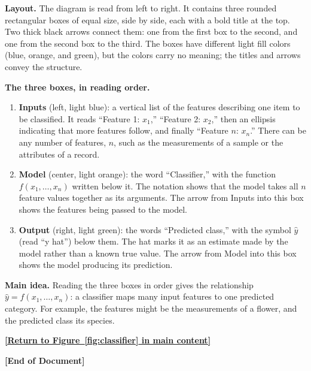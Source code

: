 \documentclass[11pt]{article}
\begin{document}
\textbf{Layout.} The diagram is read from left to right. It contains three rounded rectangular boxes of equal size, side by side, each with a bold title at the top. Two thick black arrows connect them: one from the first box to the second, and one from the second box to the third. The boxes have different light fill colors (blue, orange, and green), but the colors carry no meaning; the titles and arrows convey the structure.

\textbf{The three boxes, in reading order.}
\begin{enumerate}
    \item \textbf{Inputs} (left, light blue): a vertical list of the features describing one item to be classified. It reads ``Feature 1: $x_1$,'' ``Feature 2: $x_2$,'' then an ellipsis indicating that more features follow, and finally ``Feature $n$: $x_n$.'' There can be any number of features, $n$, such as the measurements of a sample or the attributes of a record.
    \item \textbf{Model} (center, light orange): the word ``Classifier,'' with the function $f(x_1, \ldots, x_n)$ written below it. The notation shows that the model takes all $n$ feature values together as its arguments. The arrow from Inputs into this box shows the features being passed to the model.
    \item \textbf{Output} (right, light green): the words ``Predicted class,'' with the symbol $\hat{y}$ (read ``y hat'') below them. The hat marks it as an estimate made by the model rather than a known true value. The arrow from Model into this box shows the model producing its prediction.
\end{enumerate}

\textbf{Main idea.} Reading the three boxes in order gives the relationship $\hat{y} = f(x_1, \ldots, x_n)$: a classifier maps many input features to one predicted category. For example, the features might be the measurements of a flower, and the predicted class its species.

\hyperref[anchor:classifier-return]{\textbf{[Return to Figure~\ref*{fig:classifier} in main content]}}

\vspace{3\baselineskip}
\begin{center}
\textbf{[End of Document]}
\end{center}
\end{document}

